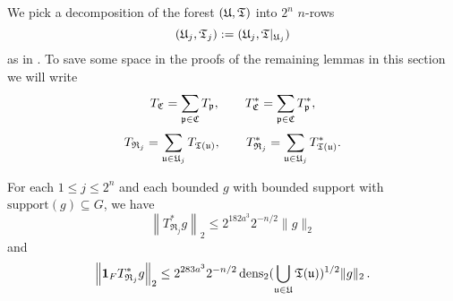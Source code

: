 We pick a decomposition of the forest $({\mathfrak U}, {\mathfrak T})$ into $2^n$ $n$-rows
\begin{equation*}
({\mathfrak U}_j, {\mathfrak T}_j) := ({\mathfrak U}_j, {\mathfrak T}|_{{\mathfrak U}_j})
\end{equation*}
as in . To save some space in the proofs of the remaining lemmas in this section we will write
    $$
        T_{{\mathfrak C}} = \sum_{{\mathfrak p} \in {\mathfrak C}} T_{{\mathfrak p}},\qquad T_{{\mathfrak C}}^* = \sum_{{\mathfrak p} \in {\mathfrak C}} T_{{\mathfrak p}}^*,
    $$
    $$
        T_{\mathfrak{R}_j} = \sum_{{\mathfrak u} \in {\mathfrak U}_j} T_{{\mathfrak T}({\mathfrak u})},\qquad T_{\mathfrak{R}_j}^* = \sum_{{\mathfrak u} \in {\mathfrak U}_j} T_{{\mathfrak T}({\mathfrak u})}^*.
    $$
\begin{lemma}
    \label{row-bound}
    \leanok
    For each $1 \le j \le 2^n$ and each bounded $g$ with bounded support with $\text{support}(g) \subseteq G$, we have
    \begin{equation}
        \label{eq-row-bound-1}
        \left\| T_{\mathfrak{R}_j}^*g \right\|_2 \le 2^{182a^3} 2^{-n/2} \|g\|_2
    \end{equation}
    and
    \begin{equation}
        \label{eq-row-bound-2}
        \left\| \mathbf{1}_F T_{\mathfrak{R}_j}^*g \right\|_2 \le 2^{283a^3} 2^{-n/2} \operatorname{\operatorname{dens}}_2(\bigcup_{{\mathfrak u}\in {\mathfrak U}}{\mathfrak T}({\mathfrak u}))^{1/2} \|g\|_2\,.
    \end{equation}
\end{lemma}

